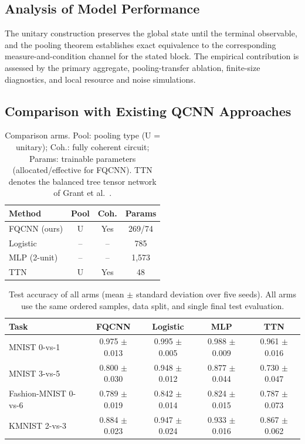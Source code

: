 \documentclass[conference]{IEEEtran}
\begin{document}
\subsection{Analysis of Model Performance}
The unitary construction preserves the global state until the terminal observable, and the pooling theorem establishes exact equivalence to the corresponding measure-and-condition channel for the stated block. The empirical contribution is assessed by the primary aggregate, pooling-transfer ablation, finite-size diagnostics, and local resource and noise simulations.

\subsection{Comparison with Existing QCNN Approaches}

\begin{table}[!t]
\caption{Comparison arms. Pool: pooling type (U = unitary); Coh.: fully coherent circuit; Params: trainable parameters (allocated/effective for FQCNN). TTN denotes the balanced tree tensor network of Grant et al.~\cite{ref46}.}
\label{tab:comparison}
\centering
\begin{tabular}{@{}lccc@{}}
\toprule
\textbf{Method} & \textbf{Pool} & \textbf{Coh.} & \textbf{Params} \\
\midrule
FQCNN (ours) & U & Yes & 269/74 \\
Logistic & -- & -- & 785 \\
MLP (2-unit) & -- & -- & 1,573 \\
TTN & U & Yes & 48 \\
\bottomrule
\end{tabular}
\end{table}

\begin{table}[!t]
\caption{Test accuracy of all arms (mean $\pm$ standard deviation over five seeds). All arms use the same ordered samples, data split, and single final test evaluation.}
\label{tab:q1comparison}
\centering
\begin{tabular}{lcccc}
\toprule
\textbf{Task} & \textbf{FQCNN} & \textbf{Logistic} & \textbf{MLP} & \textbf{TTN} \\
\midrule
MNIST 0-vs-1 &  0.975 $\pm$ 0.013 & 0.995 $\pm$ 0.005 & 0.988 $\pm$ 0.009 & 0.961 $\pm$ 0.016 \\
MNIST 3-vs-5 &  0.800 $\pm$ 0.030 & 0.948 $\pm$ 0.012 & 0.877 $\pm$ 0.044 & 0.730 $\pm$ 0.047 \\
Fashion-MNIST 0-vs-6 &  0.789 $\pm$ 0.019 & 0.842 $\pm$ 0.014 & 0.824 $\pm$ 0.015 & 0.787 $\pm$ 0.073 \\
KMNIST 2-vs-3 &  0.884 $\pm$ 0.023 & 0.947 $\pm$ 0.024 & 0.933 $\pm$ 0.016 & 0.867 $\pm$ 0.062 \\
\bottomrule
\end{tabular}
\end{table}
\end{document}
